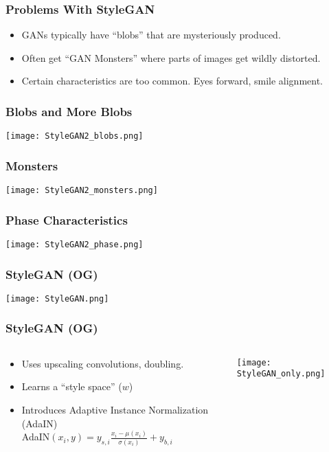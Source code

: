 \begin{frame}
    \frametitle{Problems With StyleGAN}
    \begin{itemize}
        \item GANs typically have ``blobs'' that are mysteriously produced.
        \item Often get ``GAN Monsters'' where parts of images get wildly
            distorted.
        \item Certain characteristics are too common. Eyes forward, smile
            alignment. 
    \end{itemize}
\end{frame}

\begin{frame}
    \frametitle{Blobs and More Blobs}
    \center\texttt{[image: StyleGAN2\_blobs.png]}
\end{frame}

\begin{frame}
    \frametitle{Monsters}
    \center\texttt{[image: StyleGAN2\_monsters.png]}
\end{frame}

\begin{frame}
    \frametitle{Phase Characteristics}
    \center\texttt{[image: StyleGAN2\_phase.png]}
\end{frame}

\begin{frame}
    \frametitle{StyleGAN (OG)}
    \center\texttt{[image: StyleGAN.png]}
\end{frame}

\begin{frame}
    \frametitle{StyleGAN (OG)}
    \begin{columns}
        \begin{column}{0.48\paperwidth}
            \begin{itemize}
                \item Uses upscaling convolutions, doubling.
                \item Learns a ``style space'' ($w$)
                \item Introduces Adaptive Instance Normalization (AdaIN)\\
                    AdaIN$(x_i,y) = y_{s,i}\frac{x_i - \mu(x_i)}{\sigma(x_i)} +
                    y_{b,i}$
            \end{itemize}
        \end{column}
        \begin{column}{0.48\paperwidth}
            \center\texttt{[image: StyleGAN\_only.png]}
        \end{column}
    \end{columns}
\end{frame}

